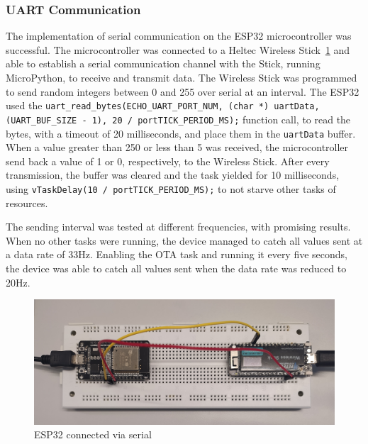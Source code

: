 \subsubsection{UART Communication}

The implementation of serial communication on the ESP32 microcontroller was successful. The microcontroller was connected to a Heltec Wireless Stick~\ref{fig:serial_connection} and able to establish a serial communication channel with the Stick, running MicroPython, to receive and transmit data. The Wireless Stick was programmed to send random integers between 0 and 255 over serial at an interval. The ESP32 used the \texttt{uart\_read\_bytes(ECHO\_UART\_PORT\_NUM, (char *) uartData, (UART\_BUF\_SIZE - 1), 20 / portTICK\_PERIOD\_MS);} function call, to read the bytes, with a timeout of 20 milliseconds, and place them in the \texttt{uartData} buffer. When a value greater than 250 or less than 5 was received, the microcontroller send back a value of 1 or 0, respectively, to the Wireless Stick. After every transmission, the buffer was cleared and the task yielded for 10 milliseconds, using \texttt{vTaskDelay(10 / portTICK\_PERIOD\_MS);} to not starve other tasks of resources.

The sending interval was tested at different frequencies, with promising results. When no other tasks were running, the device managed to catch all values sent at a data rate of 33Hz. Enabling the OTA task and running it every five seconds, the device was able to catch all values sent when the data rate was reduced to 20Hz.

\begin{figure}[ht]
  \centering
  \includegraphics[width=0.8\linewidth]{figures/serial_connection.jpg}
  \caption{ESP32 connected via serial}
  \label{fig:serial_connection}
\end{figure}


